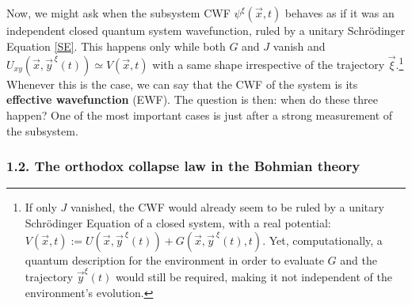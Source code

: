 \documentclass[11pt, a4paper]{article} %
\begin{document}
Now, we might ask when the subsystem CWF $\psi^\xi(\vec{x},t)$ behaves as if it was an independent closed quantum system wavefunction, ruled by a unitary Schrödinger Equation \eqref{SE}. This happens only while both $G$ and $J$ vanish and $U_{xy}(\vec{x},\vec{y}^{\,\xi}(t))\simeq V(\vec{x},t)$ with a same shape irrespective of the trajectory $\vec{\xi}$.\footnote{ If only $J$ vanished, the CWF would already seem to be ruled by a unitary Schrödinger Equation of a closed system, with a real potential: $V(\vec{x},t):=U(\vec{x},\vec{y}^{\:\xi}(t))+G(\vec{x},\vec{y}^{\:\xi}(t),t)$. Yet, computationally, a quantum description for the environment in order to evaluate $G$ and the trajectory $\vec{y}^\xi(t)$ would still be required, making it not independent of the environment's evolution. } Whenever this is the case, we can say that the CWF of the system is its {\bf effective wavefunction} (EWF). The question is then: when do these three happen? One of the most important cases is just after a strong measurement of the subsystem. 

\vspace{-0.2cm}

\subsubsection*{1.2. The orthodox collapse law in the Bohmian theory}
\vspace{-0.1cm}
\end{document}
